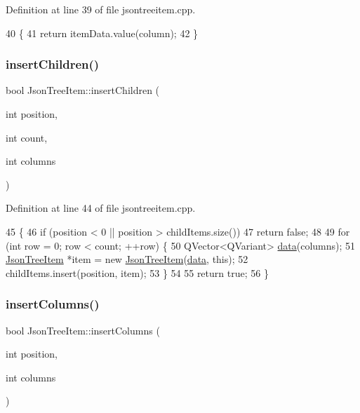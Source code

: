 Definition at line 39 of file jsontreeitem.\+cpp.


\begin{DoxyCode}
40 \{
41     \textcolor{keywordflow}{return} itemData.value(column);
42 \}
\end{DoxyCode}
\mbox{\label{class_json_tree_item_a890a0b7cf4aabcaa43e0726d672ba34a}} 
\subsubsection{\texorpdfstring{insert\+Children()}{insertChildren()}}
{\footnotesize\ttfamily bool Json\+Tree\+Item\+::insert\+Children (\begin{DoxyParamCaption}\item[{int}]{position,  }\item[{int}]{count,  }\item[{int}]{columns }\end{DoxyParamCaption})}



Definition at line 44 of file jsontreeitem.\+cpp.


\begin{DoxyCode}
45 \{
46     \textcolor{keywordflow}{if} (position < 0 || position > childItems.size())
47         \textcolor{keywordflow}{return} \textcolor{keyword}{false};
48 
49     \textcolor{keywordflow}{for} (\textcolor{keywordtype}{int} row = 0; row < count; ++row) \{
50         QVector<QVariant> \hyperlink{class_json_tree_item_a3cd46e11efb01a8c7f59d6bf3c4582d4}{data}(columns);
51         \hyperlink{class_json_tree_item}{JsonTreeItem} *item = \textcolor{keyword}{new} \hyperlink{class_json_tree_item_a3a4ebfeec3401b43940cddc8dd644727}{JsonTreeItem}(\hyperlink{class_json_tree_item_a3cd46e11efb01a8c7f59d6bf3c4582d4}{data}, \textcolor{keyword}{this});
52         childItems.insert(position, item);
53     \}
54 
55     \textcolor{keywordflow}{return} \textcolor{keyword}{true};
56 \}
\end{DoxyCode}
\mbox{\label{class_json_tree_item_a189b5b2926b94dc53f3aaa366cf66b05}} 
\subsubsection{\texorpdfstring{insert\+Columns()}{insertColumns()}}
{\footnotesize\ttfamily bool Json\+Tree\+Item\+::insert\+Columns (\begin{DoxyParamCaption}\item[{int}]{position,  }\item[{int}]{columns }\end{DoxyParamCaption})}



